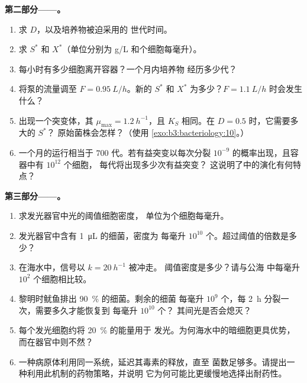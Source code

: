 \begin{problem}
\medskip
\noindent\textbf{第二部分——。}
\begin{enumerate}[resume]
  \item 求 $D$，以及培养物被迫采用的
        世代时间。
  \item 求 $S^{*}$ 和 $X^{*}$（单位分别为 g/L 和个细胞每毫升）。
  \item 每小时有多少细胞离开容器？一个月内培养物
        经历多少代？
  \item 将泵的流量调至 $F = \qty{0.95}{L/h}$。新的 $S^{*}$ 和
        $X^{*}$ 为多少？$F = \qty{1.1}{L/h}$ 时会发生什么？
  \item 出现一个突变体，其 $\mu_{\max} = \qty{1.2}{h^{-1}}$，且
        $K_{S}$ 相同。在 $D = 0.5$ 时，它需要多大的 $S^{*}$？
        原始菌株会怎样？（使用
        \cref{exo:b3:bacteriology:10}。）
  \item 一个月的运行相当于 $700$ 代。若有益突变以每次分裂
        $10^{-9}$ 的概率出现，且容器中有 $10^{12}$ 个细胞，
        每代将出现多少次有益突变？
        这说明了中的演化有何特点？
\end{enumerate}

\medskip
\noindent\textbf{第三部分——。}
\begin{enumerate}[resume]
  \item 求发光器官中光的阈值细胞密度，
        单位为个细胞每毫升。
  \item 发光器官中含有 \qty{1}{\micro L} 的细菌，密度为
        每毫升 $10^{10}$ 个。超过阈值的倍数是多少？
  \item 在海水中，信号以 $k = \qty{20}{h^{-1}}$ 被冲走。
        阈值密度是多少？请与公海
        中每毫升 $10^{2}$ 个细胞相比较。
  \item 黎明时鱿鱼排出 \qty{90}{\%} 的细菌。剩余的细菌
        每毫升 $10^{9}$ 个，每 \qty{2}{h} 分裂一次，需要多久才能恢复到
        每毫升 $10^{10}$ 个？
        其间光是否会熄灭？
  \item 每个发光细胞约将 \qty{20}{\%} 的能量用于
        发光。为何海水中的暗细胞更具优势，
        而在器官中则不然？
  \item 一种病原体利用同一系统，延迟其毒素的释放，直至
        菌数足够多。请提出一种利用此机制的药物策略，并说明
        它为何可能比更缓慢地选择出耐药性。
\end{enumerate}


\end{problem}
